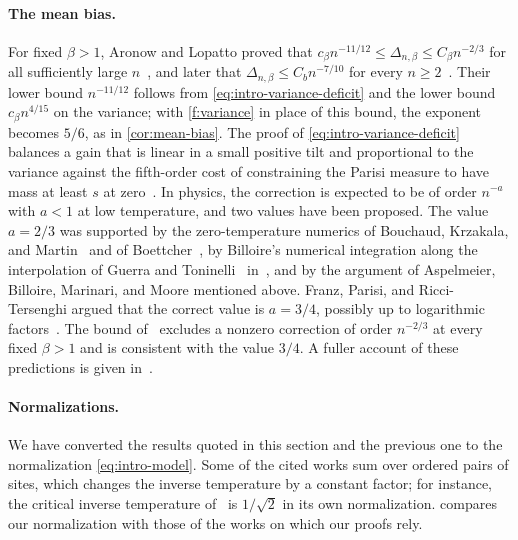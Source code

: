 \paragraph{The mean bias.}
For fixed $\beta>1$, Aronow and Lopatto proved that
$c_\beta n^{-11/12}\le\Delta_{n,\beta}\le C_\beta n^{-2/3}$ for all
sufficiently large $n$~\cite[Theorem~1.4]{quantitative-parisi}, and later
that $\Delta_{n,\beta}\le C_b n^{-7/10}$ for every
$n\ge2$~\cite[Theorem~1.1]{hexagon-bias}. Their lower bound $n^{-11/12}$
follows from \eqref{eq:intro-variance-deficit} and the lower bound
$c_\beta n^{4/15}$ on the variance; with \eqref{f:variance} in place of this
bound, the exponent becomes $5/6$, as in \cref{cor:mean-bias}. The proof of
\eqref{eq:intro-variance-deficit} balances a gain that is linear in a small
positive tilt and proportional to the variance against the fifth-order cost
of constraining the Parisi measure to have mass at least $s$ at
zero~\cite[Lemma~7.2]{quantitative-parisi}. In physics, the correction is
expected to be of order $n^{-a}$ with $a<1$ at low temperature, and
two values have been proposed. The value $a=2/3$ was supported by the
zero-temperature numerics of Bouchaud, Krzakala, and
Martin~\cite{bouchaud-krzakala-martin-2003} and of
Boettcher~\cite{boettcher-2005}, by Billoire's numerical integration along
the interpolation of Guerra and Toninelli~\cite{guerra-toninelli-2002}
in~\cite{billoire-2006}, and by the
argument of Aspelmeier, Billoire, Marinari, and Moore mentioned above.
Franz, Parisi, and Ricci-Tersenghi argued that the correct value is
$a=3/4$, possibly up to logarithmic
factors~\cite[equations~(13)--(17)]{franz-parisi-ricci-2026}. The bound
of~\cite{hexagon-bias} excludes a nonzero correction of order $n^{-2/3}$ at
every fixed $\beta>1$ and is consistent with the value $3/4$. A fuller account
of these predictions is given in~\cite[Section~1.4]{hexagon-bias}.

\paragraph{Normalizations.}
We have converted the results quoted in this section and the previous one to
the normalization \eqref{eq:intro-model}. Some of the cited works sum over
ordered pairs of sites, which changes the inverse temperature by a constant
factor; for instance, the critical inverse temperature
of~\cite{chen-lam-2019} is $1/\sqrt2$ in its own normalization.
 compares our normalization with those of the
works on which our proofs rely.

